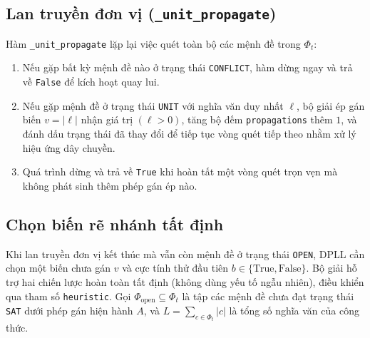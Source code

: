 \subsection{Lan truyền đơn vị (\texttt{\_unit\_propagate})}
Hàm \texttt{\_unit\_propagate} lặp lại việc quét toàn bộ các mệnh đề trong $\Phi_t$:
\begin{enumerate}
    \item Nếu gặp bất kỳ mệnh đề nào ở trạng thái \texttt{CONFLICT}, hàm dừng ngay và trả về \texttt{False} để kích hoạt quay lui.
    \item Nếu gặp mệnh đề ở trạng thái \texttt{UNIT} với nghĩa văn duy nhất $\ell$, bộ giải ép gán biến $v = |\ell|$ nhận giá trị $(\ell > 0)$, tăng bộ đếm \texttt{propagations} thêm $1$, và đánh dấu trạng thái đã thay đổi để tiếp tục vòng quét tiếp theo nhằm xử lý hiệu ứng dây chuyền.
    \item Quá trình dừng và trả về \texttt{True} khi hoàn tất một vòng quét trọn vẹn mà không phát sinh thêm phép gán ép nào.
\end{enumerate}

\subsection{Chọn biến rẽ nhánh tất định}
Khi lan truyền đơn vị kết thúc mà vẫn còn mệnh đề ở trạng thái \texttt{OPEN}, DPLL cần chọn một biến chưa gán $v$ và cực tính thử đầu tiên $b \in \{\text{True}, \text{False}\}$. Bộ giải hỗ trợ hai chiến lược hoàn toàn tất định (không dùng yếu tố ngẫu nhiên), điều khiển qua tham số \texttt{heuristic}. Gọi $\Phi_{\text{open}} \subseteq \Phi_t$ là tập các mệnh đề chưa đạt trạng thái \texttt{SAT} dưới phép gán hiện hành $A$, và $L = \sum_{c \in \Phi_t} |c|$ là tổng số nghĩa văn của công thức.

